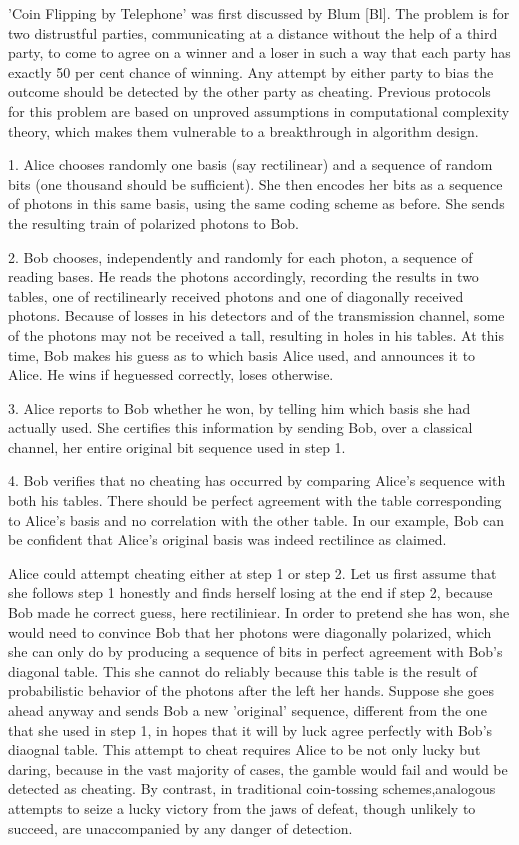 'Coin Flipping by Telephone' was first dis­cussed by Blum [Bl]. The problem is for two dis­trustful parties, communicating at a distance with­out the help of a third party, to come to agree on a winner and a loser in such a way that each party has exactly 50 per cent chance of winning. Any attempt by either party to bias the outcome should be de­tected by the other party as cheating. Previous protocols for this problem are based on unproved assumptions in computational complexity theory, which makes them vulnerable to a breakthrough in algorithm design.

1. Alice chooses randomly one basis (say rectili­near) and a sequence of random bits (one thousand should be sufficient). She then encodes her bits as a sequence of photons in this same basis, using the same coding scheme as before. She sends the result­ing train of polarized photons to Bob.

2. Bob chooses, independently and randomly for each photon, a sequence of reading bases. He reads the photons accordingly, recording the results in two tables, one of rectilinearly received photons and one of diagonally received photons. Because of losses in his detectors and of the transmission channel, some of the photons may not be received a tall, resulting in holes in his tables. At this time, Bob makes his guess as to which basis Alice used, and announces it to Alice. He wins if heguessed correctly, loses otherwise.

3. Alice reports to Bob whether he won, by telling him which basis she had actually used. She certif­ies this information by sending Bob, over a classi­cal channel, her entire original bit sequence used in step 1.

4. Bob verifies that no cheating has occurred by comparing Alice's sequence with both his tables. There should be perfect agreement with the table corresponding to Alice's basis and no correlation with the other table. In our example, Bob can be confident that Alice's original basis was indeed rectilince  as claimed.

Alice could attempt cheating either at step 1 or step 2. Let us first assume that she follows step 1 honestly and finds herself losing at the end if step 2, because Bob made he correct guess, here rectiliniear. In order to pretend she has won, she would need to convince Bob that her photons were diagonally polarized, which she can only do by prod­ucing a sequence of bits in perfect agreement with Bob's diagonal table. This she cannot do reliably because this table is the result of probabilistic behavior of the photons after the left her hands. Suppose she goes ahead anyway and sends Bob a new 'original' sequence, different from the one that she used in step 1, in hopes that it will by luck agree perfectly with Bob's diaognal table. This attempt to cheat requires Alice to be not only lucky but daring, because in the vast majority of cases, the gamble would fail and would be detected as cheating. By contrast, in traditional coin-tossing schemes,analogous attempts to seize a lucky victory from the jaws of defeat, though unlikely to succeed, are unaccompanied by any danger of detection.

